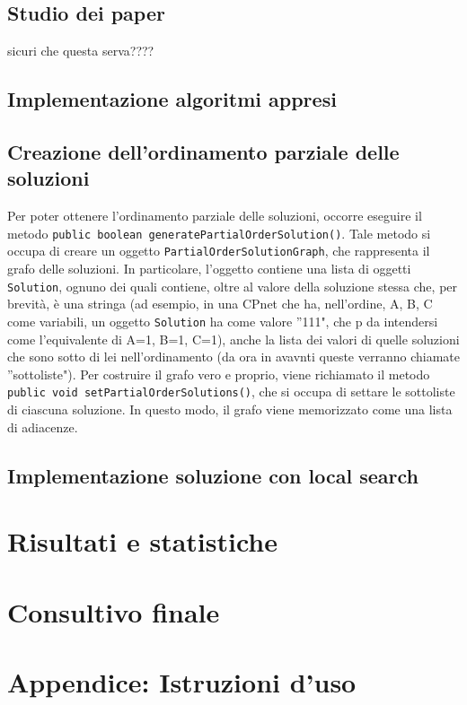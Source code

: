 \documentclass[a4paper,titlepage]{article}
\begin{document}
\subsection{Studio dei paper} 

sicuri che questa serva????
\subsection{Implementazione algoritmi appresi}

\subsection{Creazione dell'ordinamento parziale delle soluzioni}

Per poter ottenere l'ordinamento parziale delle soluzioni, occorre eseguire il metodo \texttt{public boolean generatePartialOrderSolution()}.
Tale metodo si occupa di creare un oggetto \texttt{PartialOrderSolutionGraph}, che rappresenta il grafo delle soluzioni. In particolare,  l'oggetto contiene una lista di oggetti \texttt{Solution}, ognuno dei quali contiene, oltre al valore della soluzione stessa che, per brevità, è una stringa (ad esempio, in una CPnet che ha, nell'ordine, A, B, C come variabili, un oggetto \texttt{Solution} ha come valore ''111", che p da intendersi come l'equivalente di {A=1, B=1, C=1}), anche la lista dei valori di quelle soluzioni che sono sotto di lei nell'ordinamento (da ora in avavnti queste verranno chiamate ''sottoliste").
Per costruire il grafo vero e proprio, viene richiamato il metodo \texttt{public void setPartialOrderSolutions()}, che si occupa di settare le sottoliste di ciascuna soluzione. In questo modo, il grafo viene memorizzato come una lista di adiacenze.
\subsection{Implementazione soluzione con local search}

\section{Risultati e statistiche}

\section{Consultivo finale}

\section{Appendice: Istruzioni d'uso}
\end{document}
